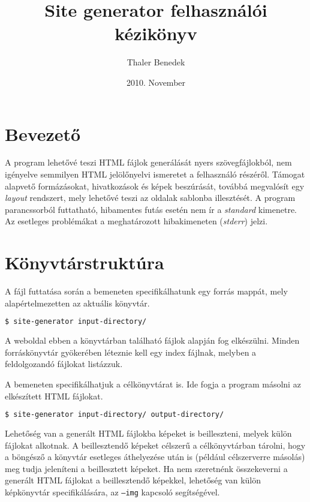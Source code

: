 \documentclass[a4paper,10pt]{article}
\title{Site generator felhasználói kézikönyv}
\author{Thaler Benedek}
\date{2010. November}
\begin{document}
\maketitle
\tableofcontents

\section{Bevezető}
A program lehetővé teszi HTML fájlok generálását nyers szövegfájlokból, nem igényelve semmilyen HTML jelölőnyelvi ismeretet a felhasználó részéről. Támogat alapvető formázásokat, hivatkozások és képek beszúrását, továbbá megvalósít egy \emph{layout} rendszert, mely lehetővé teszi az oldalak sablonba illesztését.
A program parancssorból futtatható, hibamentes futás esetén nem ír a \emph{standard} kimenetre. Az esetleges problémákat a meghatározott hibakimeneten (\emph{stderr}) jelzi.

\section{Könyvtárstruktúra}
A fájl futtatása során a bemeneten specifikálhatunk egy forrás mappát, mely alapértelmezetten az aktuális könyvtár. 

\begin{lstlisting}[language=bash]
$ site-generator input-directory/
\end{lstlisting}

A weboldal ebben a könyvtárban található fájlok alapján fog elkészülni. Minden forráskönyvtár gyökerében léteznie kell egy index fájlnak, melyben a feldolgozandó fájlokat listázzuk.

A bemeneten specifikálhatjuk a célkönyvtárat is. Ide fogja a program másolni az elkészített HTML fájlokat.

\begin{lstlisting}[language=bash]
$ site-generator input-directory/ output-directory/
\end{lstlisting}

Lehetőség van a generált HTML fájlokba képeket is beilleszteni, melyek külön fájlokat alkotnak. A beillesztendő képeket célszerű a célkönyvtárban tárolni, hogy a böngésző a könyvtár esetleges áthelyezése után is (például célszerverre másolás) meg tudja jeleníteni a beillesztett képeket.
Ha nem szeretnénk összekeverni a generált HTML fájlokat a beillesztendő képekkel, lehetőség van külön képkönyvtár specifikálására, az \texttt{--img} kapcsoló segítségével.
\end{document}
